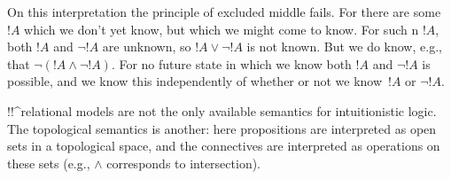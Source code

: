\documentclass[../../../include/open-logic-section]{subfiles}
\begin{document}
On this interpretation the principle of excluded middle fails. For
there are some $!A$ which we don't yet know, but which we might come
to know. For such n $!A$, both $!A$ and $\lnot !A$ are unknown, so
$!A \lor \lnot !A$ is not known. But we do know, e.g., that $\lnot(!A
\land \lnot !A)$. For no future state in which we know both $!A$ and
$\lnot !A$ is possible, and we know this independently of whether or
not we know~$!A$ or $\lnot !A$.

!!^{relational model}s are not the only available semantics for
intuitionistic logic. The topological semantics is another: here
propositions are interpreted as open sets in a topological space, and
the connectives are interpreted as operations on these sets (e.g.,
$\land$ corresponds to intersection).
\end{document}
